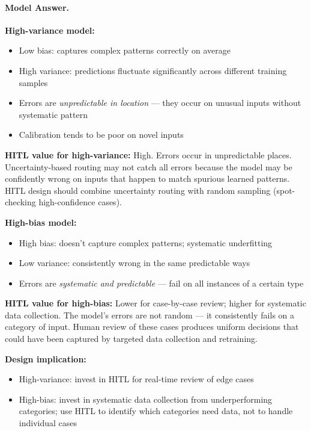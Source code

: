 \paragraph{Model Answer.}

\textbf{High-variance model:}
\begin{itemize}
    \item Low bias: captures complex patterns correctly on average
    \item High variance: predictions fluctuate significantly across different training samples
    \item Errors are \emph{unpredictable in location} --- they occur on unusual inputs without systematic pattern
    \item Calibration tends to be poor on novel inputs
\end{itemize}

\textbf{HITL value for high-variance:} High. Errors occur in unpredictable places. Uncertainty-based routing may not catch all errors because the model may be confidently wrong on inputs that happen to match spurious learned patterns. HITL design should combine uncertainty routing with random sampling (spot-checking high-confidence cases).

\textbf{High-bias model:}
\begin{itemize}
    \item High bias: doesn't capture complex patterns; systematic underfitting
    \item Low variance: consistently wrong in the same predictable ways
    \item Errors are \emph{systematic and predictable} --- fail on all instances of a certain type
\end{itemize}

\textbf{HITL value for high-bias:} Lower for case-by-case review; higher for systematic data collection. The model's errors are not random --- it consistently fails on a category of input. Human review of these cases produces uniform decisions that could have been captured by targeted data collection and retraining.

\textbf{Design implication:}
\begin{itemize}
    \item High-variance: invest in HITL for real-time review of edge cases
    \item High-bias: invest in systematic data collection from underperforming categories; use HITL to identify which categories need data, not to handle individual cases
\end{itemize}

